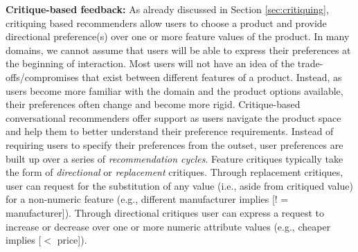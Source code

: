 \textbf{Critique-based feedback:}
As already discussed in Section \ref{sec:critiquing}, critiquing based recommenders allow users to choose a product and provide directional preference(s) over one or more feature values of the product.
In many domains, we cannot assume that users will be able to express their preferences at the beginning of interaction.
 Most users will not have an idea of the trade-offs/compromises that exist between different features of a product.
 Instead, as users become more familiar with the domain and the product options available, their preferences often change and become more rigid.
Critique-based conversational recommenders offer support as users navigate the product space and help them to better understand their preference requirements. 
Instead of requiring users to specify their preferences from the outset, user preferences are built up over a series of \textit{recommendation cycles}. 
Feature critiques typically take the form of \textit{directional} or \textit{replacement} critiques. 
Through replacement critiques, user can request for the substitution of any value (i.e., aside from critiqued value) for a non-numeric feature (e.g., different manufacturer implies [! = manufacturer]).
Through directional critiques user can express a request to increase or decrease over one or more numeric attribute values (e.g., cheaper implies [$<$  price]). 



